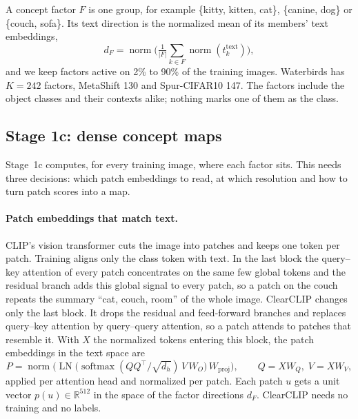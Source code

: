 \documentclass{article}
\begin{document}
A concept factor $F$ is one group, for example \{kitty, kitten, cat\}, \{canine, dog\} or \{couch, sofa\}. Its text direction is the normalized mean of its members' text embeddings,
\begin{equation}
 d_F=\operatorname{norm}\Big(\tfrac{1}{|F|}\textstyle\sum_{k\in F}\operatorname{norm}(t^{\text{text}}_k)\Big),
\end{equation}
and we keep factors active on 2\% to 90\% of the training images. Waterbirds has $K=242$ factors, MetaShift 130 and Spur-CIFAR10 147. The factors include the object classes and their contexts alike; nothing marks one of them as the class.

\subsection{Stage 1c: dense concept maps}
\label{sec:maps}
Stage~1c computes, for every training image, where each factor sits. This needs three decisions: which patch embeddings to read, at which resolution and how to turn patch scores into a map.

\paragraph{Patch embeddings that match text.}
CLIP's vision transformer cuts the image into patches and keeps one token per patch. Training aligns only the class token with text. In the last block the query--key attention of every patch concentrates on the same few global tokens \citep{zhou2022maskclip,wang2024sclip,darcet2024registers} and the residual branch adds this global signal to every patch, so a patch on the couch repeats the summary ``cat, couch, room'' of the whole image. ClearCLIP \citep{lan2024clearclip} changes only the last block. It drops the residual and feed-forward branches and replaces query--key attention by query--query attention, so a patch attends to patches that resemble it. With $X$ the normalized tokens entering this block, the patch embeddings in the text space are
\begin{equation}
 P=\operatorname{norm}\!\Big(\operatorname{LN}\big(\operatorname{softmax}(QQ^\top/\sqrt{d_h})\,V\,W_O\big)\,W_{\mathrm{proj}}\Big),
 \qquad Q=XW_Q,\; V=XW_V,
\end{equation}
applied per attention head and normalized per patch. Each patch $u$ gets a unit vector $p(u)\in\mathbb{R}^{512}$ in the space of the factor directions $d_F$. ClearCLIP needs no training and no labels.
\end{document}
